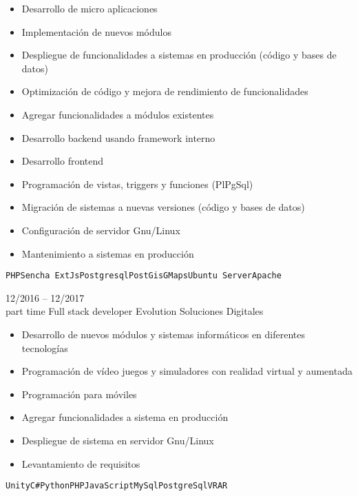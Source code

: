 \begin{entrylist}
{\begin{itemize}
    	        \setlength\itemsep{0pt}
    	        \setlength\parskip{0pt}
    	        \item Desarrollo de micro aplicaciones
    	        \item Implementación de nuevos módulos
    	        \item Despliegue de funcionalidades a sistemas en producción (código y bases de datos)
    	        \item Optimización de código y mejora de rendimiento de funcionalidades
    	        \item Agregar funcionalidades a módulos existentes
    	        \item Desarrollo backend usando framework interno
    	        \item Desarrollo frontend
    	        \item Programación de vistas, triggers y funciones (PlPgSql)
    	        \item Migración de sistemas a nuevas versiones (código y bases de datos)
    	        \item Configuración de servidor Gnu/Linux
    	        \item Mantenimiento a sistemas en producción
    	    \end{itemize}
		    \texttt{PHP}\slashsep\texttt{Sencha ExtJs}\slashsep\texttt{Postgresql}\slashsep\texttt{PostGis}\slashsep\texttt{GMaps}\slashsep\texttt{Ubuntu Server}\slashsep\texttt{Apache}
        }
	\entry
		{12/2016 -- 12/2017\\\footnotesize{part time}}
		{Full stack developer}
		{Evolution Soluciones Digitales}
		{
		    \vspace{-5mm}
    	    \begin{itemize}
    	        \setlength\itemsep{0pt}
    	        \setlength\parskip{0pt}
    	        \item Desarrollo de nuevos módulos y sistemas informáticos en diferentes tecnologías
    	        \item Programación de vídeo juegos y simuladores con realidad virtual y aumentada
    	        \item Programación para móviles
    	        \item Agregar funcionalidades a sistema en producción
    	        \item Despliegue de sistema en servidor Gnu/Linux
    	        \item Levantamiento de requisitos
    	    \end{itemize}\texttt{Unity}\slashsep\texttt{C\#}\slashsep\texttt{Python}\slashsep\texttt{PHP}\slashsep\texttt{JavaScript}\slashsep\texttt{MySql}\slashsep\texttt{PostgreSql}\slashsep\texttt{VR}\slashsep\texttt{AR}
}
\end{entrylist}
